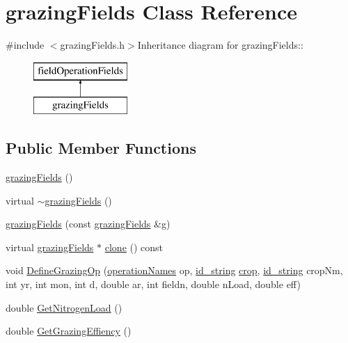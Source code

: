 \hypertarget{classgrazing_fields}{
\section{grazingFields Class Reference}
\label{classgrazing_fields}
}


{\ttfamily \#include $<$grazingFields.h$>$}Inheritance diagram for grazingFields::\begin{figure}[H]
\begin{center}
\leavevmode
\includegraphics[height=2cm]{classgrazing_fields}
\end{center}
\end{figure}
\subsection*{Public Member Functions}
\begin{DoxyCompactItemize}
\item 
\hyperlink{classgrazing_fields_acdb3d6a1c95e24d586c272e4f4822a16}{grazingFields} ()
\item 
virtual \hyperlink{classgrazing_fields_a04d458777a15183181d8abc32778bf06}{$\sim$grazingFields} ()
\item 
\hyperlink{classgrazing_fields_ae1390c8af68f4316a5d26798ab706407}{grazingFields} (const \hyperlink{classgrazing_fields}{grazingFields} \&g)
\item 
virtual \hyperlink{classgrazing_fields}{grazingFields} $\ast$ \hyperlink{classgrazing_fields_a512df2449aac5ed1621dd4c543857712}{clone} () const 
\item 
void \hyperlink{classgrazing_fields_ae595ca8c2b07929bef922b6514f88590}{DefineGrazingOp} (\hyperlink{operation_names_8h_a77d40de6faa131199a5de6df3d9c7e3d}{operationNames} op, \hyperlink{classfield_operation_fields_a65517d20c09329343461131d07d48ecb}{id\_\-string} \hyperlink{classcrop}{crop}, \hyperlink{classfield_operation_fields_a65517d20c09329343461131d07d48ecb}{id\_\-string} cropNm, int yr, int mon, int d, double ar, int fieldn, double nLoad, double eff)
\item 
double \hyperlink{classgrazing_fields_a00761e6f4df7fbca403c10fba82c57fa}{GetNitrogenLoad} ()
\item 
double \hyperlink{classgrazing_fields_a4ec827f111f1021c9d314945f72bdde7}{GetGrazingEffiency} ()
\end{DoxyCompactItemize}


